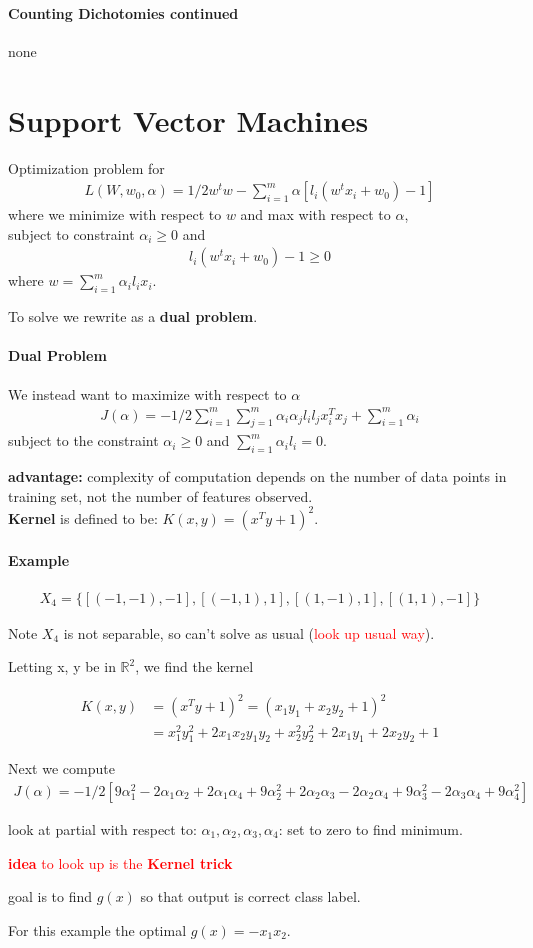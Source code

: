 \documentclass[12pt]{article}
\def\R{\ensuremath{\mathbb{R}}} %
\newcommand{\bt}[1]{\textbf{#1}} %
\newcommand{\eq}[1]{\begin{align*}#1\end{align*}} %
\renewcommand{\eq}[1]{\begin{align*}#1\end{align*}} %
\begin{document}
\subsection*{Counting Dichotomies continued}
none
\part*{Support Vector Machines}
Optimization problem for 
\eq{
L(W, w_0, \alpha) = 1/2 w^tw - \sum_{i=1}^m \alpha[l_i(w^tx_i + w_0)-1]
}
where we minimize with respect to $w$ and max with respect to $\alpha$,\\
subject to constraint $\alpha_i \geq 0$ and 
\eq{
l_i(w^tx_i+w_0)-1 \geq 0
}
where $w = \sum_{i=1}^m \alpha_i l_ix_i$.

To solve we rewrite as a \bt{dual problem}.
\subsection*{Dual Problem}
We instead want to maximize with respect to $\alpha$
\eq{
J(\alpha) = -1/2 \sum_{i=1}^m \sum_{j=1}^m \alpha_i \alpha_j l_i l_j x_i^Tx_j + \sum_{i=1}^m \alpha_i
}
subject to the constraint $\alpha_i \geq 0$ and $\sum_{i=1}^m \alpha_il_i=0$.

\bt{advantage:} complexity of computation depends on the number of data points in training set, not the number of features observed. \\


\bt{Kernel} is defined to be: $K(x, y) = (x^Ty+1)^2$.

\subsection*{Example}
\eq{
X_4 = \{ [(-1, -1), -1], [(-1, 1), 1], [(1, -1), 1], [(1, 1), -1]\}
}

Note $X_4$ is not separable, so can't solve as usual (\textcolor{red}{look up usual way}).

Letting x, y be in $\R^2$, we find the kernel

\eq{K(x, y) &= (x^Ty + 1)^2 = (x_1y_1 + x_2y_2 + 1)^2\\
& = x_1^2y_1^2 + 2x_1x_2y_1y_2 + x_2^2y_2^2 + 2x_1y_1 + 2x_2y_2 + 1
}

Next we compute
\eq{
J(\alpha) = -1/2 [ 9 \alpha_1^2 - 2\alpha_1\alpha_2+2\alpha_1\alpha_4
+ 9 \alpha_2^2 + 2\alpha_2\alpha_3 - 2 \alpha_2\alpha_4 + 9\alpha_3^2 - 2\alpha_3\alpha_4 + 9 \alpha_4^2] 
}

look at partial with respect to: $\alpha_1, \alpha_2, \alpha_3, \alpha_4$:
set to zero to find minimum.

\textcolor{red}{\bt{idea} to look up is the \bt{Kernel trick}}

goal is to find $g(x)$ so that output is correct class label.

For this example the optimal $g(x) = -x_1x_2$.
\end{document}
